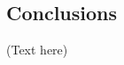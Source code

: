 \documentclass[default,jgrga]{agutex2015}
\begin{document}
\begin{article}
\section{Conclusions}


%
%
%
%
%
%
%

\begin{acknowledgments}
(Text here)
\end{acknowledgments}

%
%
%
%
%
%
%
%
%


\end{article}
\end{document}
